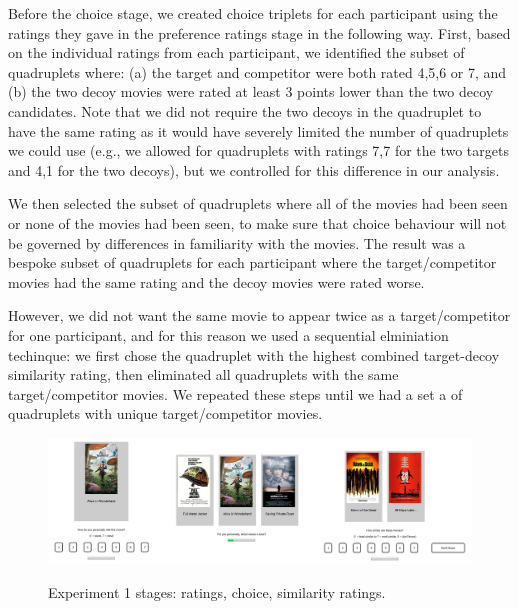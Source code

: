 \documentclass[11pt,a4paper]{article}
\begin{document}
Before the choice stage, we created choice triplets for each participant using the ratings they gave in the preference ratings stage in the following way. First, based on the individual ratings from each participant, we identified the subset of quadruplets where: (a) the target and competitor were both rated 4,5,6 or 7, and (b) the two decoy movies were rated at least 3 points lower than the two decoy candidates. Note that we did not require the two decoys in the quadruplet to have the same rating as it would have severely limited the number of quadruplets we could use (e.g., we allowed for quadruplets with ratings 7,7 for the two targets and 4,1 for the two decoys), but we controlled for this difference in our analysis.  

 We then selected the subset of quadruplets where all of the movies had been seen or none of the movies had been seen, to make sure that choice behaviour will not be governed by differences in familiarity with the movies. The result was a bespoke subset of quadruplets for each participant where the target/competitor movies had the same rating and the decoy movies were rated worse. 
 
 However, we did not want the same movie to appear twice as a target/competitor for one participant, and for this reason we used a sequential elminiation techinque: we first chose the quadruplet with the highest combined target-decoy similarity rating, then eliminated all quadruplets with the same target/competitor movies. We repeated these steps until we had a set a of quadruplets with unique target/competitor movies.  

   \cleardoublepage
{}
\begin{landscape}
\begin{figure}
\caption{Experiment 1 stages: ratings, choice, similarity ratings.}
\includegraphics[width=1.7\textwidth]{experipics.png}
\label{fig:exp1_screenshot}
\end{figure}
\end{landscape}
\cleardoublepage
{}
\setcounter{page}{\thesavepage}
\restoregeometry
\end{document}
